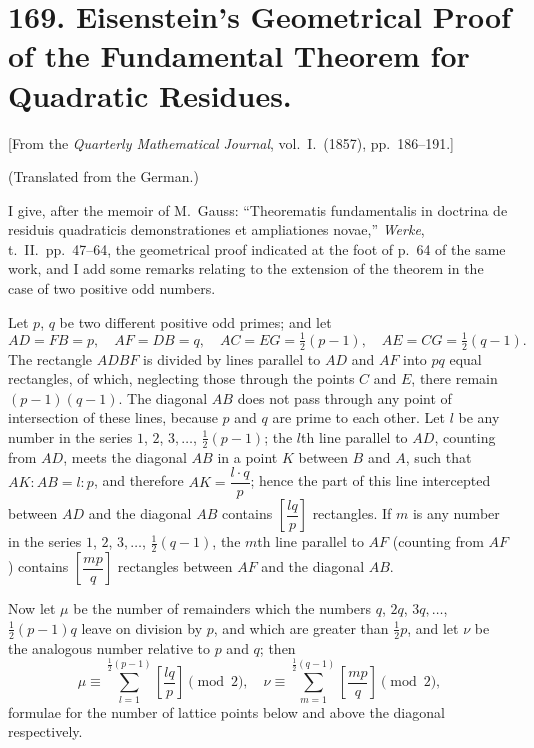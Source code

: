 \documentclass[11pt,a4paper]{article}
\theoremstyle{plain}
\begin{document}
\newpage
\section*{169. Eisenstein's Geometrical Proof of the Fundamental Theorem for Quadratic Residues.}

[From the \textit{Quarterly Mathematical Journal}, vol.~I.~(1857), pp.~186--191.]

(Translated from the German.)

I give, after the memoir of M.~Gauss: ``Theorematis fundamentalis in doctrina de residuis quadraticis demonstrationes et ampliationes novae,'' \textit{Werke}, t.~II.~pp.~47--64, the geometrical proof indicated at the foot of p.~64 of the same work, and I add some remarks relating to the extension of the theorem in the case of two positive odd numbers.

Let $p$, $q$ be two different positive odd primes; and let
\[
AD = FB = p,\quad AF = DB = q,\quad AC = EG = \tfrac{1}{2}(p-1),\quad AE = CG = \tfrac{1}{2}(q-1).
\]
The rectangle $ADBF$ is divided by lines parallel to $AD$ and $AF$ into $pq$ equal rectangles, of which, neglecting those through the points $C$ and $E$, there remain $(p-1)(q-1)$. The diagonal $AB$ does not pass through any point of intersection of these lines, because $p$ and $q$ are prime to each other. Let $l$ be any number in the series $1$, $2$, $3,\ldots$, $\frac{1}{2}(p-1)$; the $l$th line parallel to $AD$, counting from $AD$, meets the diagonal $AB$ in a point $K$ between $B$ and $A$, such that $AK:AB = l:p$, and therefore $AK = \dfrac{l \cdot q}{p}$; hence the part of this line intercepted between $AD$ and the diagonal $AB$ contains $\left[\dfrac{lq}{p}\right]$ rectangles. If $m$ is any number in the series $1$, $2$, $3,\ldots$, $\frac{1}{2}(q-1)$, the $m$th line parallel to $AF$ (counting from $AF$) contains $\left[\dfrac{mp}{q}\right]$ rectangles between $AF$ and the diagonal $AB$.

Now let $\mu$ be the number of remainders which the numbers $q$, $2q$, $3q,\ldots$, $\frac{1}{2}(p-1)q$ leave on division by $p$, and which are greater than $\frac{1}{2}p$, and let $\nu$ be the analogous number relative to $p$ and $q$; then
\[
\mu \equiv \sum_{l=1}^{\frac{1}{2}(p-1)} \left[\frac{lq}{p}\right] \pmod{2},\quad
\nu \equiv \sum_{m=1}^{\frac{1}{2}(q-1)} \left[\frac{mp}{q}\right] \pmod{2},
\]
formulae for the number of lattice points below and above the diagonal respectively.
\end{document}
